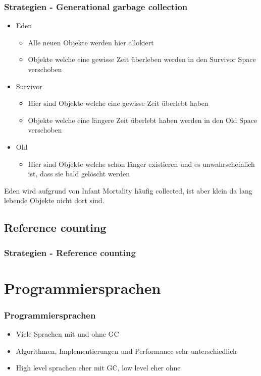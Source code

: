 \documentclass{beamer}
\begin{document}
            \begin{frame}
                \frametitle{Strategien - Generational garbage collection}
                \begin{itemize}
                    \item Eden
                    \begin{itemize}
                        \item Alle neuen Objekte werden hier allokiert
                        \item Objekte welche eine gewisse Zeit überleben werden in den Survivor Space verschoben
                    \end{itemize}
                    \item Survivor
                    \begin{itemize}
                        \item Hier sind Objekte welche eine gewisse Zeit überlebt haben
                        \item Objekte welche eine längere Zeit überlebt haben werden in den Old Space verschoben
                    \end{itemize}
                    \item Old
                    \begin{itemize}
                        \item Hier sind Objekte welche schon länger existieren und es unwahrscheinlich ist, dass sie bald gelöscht werden
                    \end{itemize}
                \end{itemize}
                Eden wird aufgrund von Infant Mortality häufig collected, ist aber klein da lang lebende Objekte nicht dort sind.
            \end{frame}

        \subsection{Reference counting}
            \begin{frame}
                \frametitle{Strategien - Reference counting}
            \end{frame}

    \section{Programmiersprachen}
        \begin{frame}
            \frametitle{Programmiersprachen}

            \begin{itemize}
                \item Viele Sprachen mit und ohne GC
                \item Algorithmen, Implementierungen und Performance sehr unterschiedlich
                \item High level sprachen eher mit GC, low level eher ohne
            \end{itemize}
        \end{frame}
\end{document}
